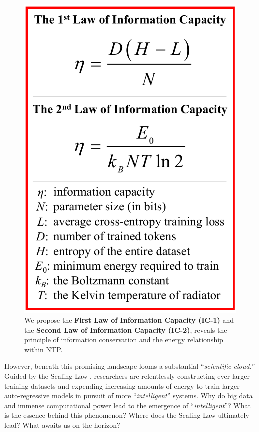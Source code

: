 \documentclass{article}
\theoremstyle{plain}
\theoremstyle{definition}
\theoremstyle{remark}
\begin{document}
\begin{figure}[ht]
\vskip 0.2in
\begin{center}
\centerline{\includegraphics[width=0.85\columnwidth]{figures/IC}}
\caption{We propose the \textbf{First Law of Information Capacity (IC-1)} and the \textbf{Second Law of Information Capacity (IC-2)}, reveals the principle of information conservation and the energy relationship within NTP.}
\label{fig:eq}
\end{center}
\vskip -0.2in
\end{figure}

However, beneath this promising landscape looms a substantial ``\textit{scientific cloud.}'' Guided by the Scaling Law \cite{ScalingLaw1_2020}, researchers are relentlessly constructing ever-larger training datasets and expending increasing amounts of energy to train larger auto-regressive models in pursuit of more ``\textit{intelligent}'' systems. Why do big data and immense computational power lead to the emergence of ``\textit{intelligent}''? What is the essence behind this phenomenon? Where does the Scaling Law ultimately lead? What awaits us on the horizon?
\end{document}
